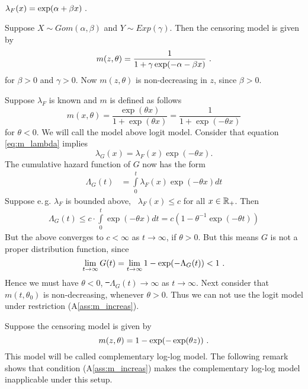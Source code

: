 $\lambda_F(x) = \exp(\alpha + \beta x)\textrm{ .}$
\begin{example}
	Suppose $X\sim Gom(\alpha, \beta)$ and $Y\sim Exp(\gamma)$. Then the censoring model is given by
	$$m(z, \theta) =\frac{1}{1 + \gamma\exp(-\alpha - \beta x)}\textrm{ .}$$
	for $\beta > 0$ and $\gamma > 0$. Now $m(z,\theta)$ is non-decreasing in $z$, since $\beta>0$.  
\end{example}
%
\begin{example}
	Suppose $\lambda_F$ is known and $m$ is defined as follows
	$$m(x,\theta) = \frac{\exp(\theta x)}{1+\exp(\theta x)} = \frac{1}{1+\exp(-\theta x)}$$
	for $\theta < 0$. We will call the model above logit model. Consider that equation \eqref{eq:m_lambda} implies  
	$$\lambda_G(x) = \lambda_F(x)\exp(-\theta x)\textrm{.}$$
	The cumulative hazard function of $G$ now has the form
	\begin{align*}
		\Lambda_G(t) &= \int\limits_0^t \lambda_F(x)\exp(-\theta x)dt
	\end{align*}
	Suppose e.\,g. $\lambda_F$ is bounded above, \ie\  $\lambda_F(x) \leq c$ for all $x\in \mathbb{R}_+$. Then
	\begin{align*}
		\Lambda_G(t) \leq c\cdot \int\limits_0^t \exp(-\theta x)dt  = c\left(1 -\theta^{-1} \exp(-\theta t)\right)
	\end{align*}	
	But the above converges to $c<\infty$ as $t\to\infty$, if $\theta>0$. But this means $G$ is not a proper distribution function, since
	$$\lim\limits_{t\to\infty} G(t) = \lim\limits_{t\to\infty} 1-\exp(-\Lambda_G(t)) < 1\textrm{ .}$$
	Hence we must have $\theta < 0$, \st\ $\Lambda_G(t) \to \infty$ as $t\to\infty$. Next consider that $m(t,\theta_0)$ is non-decreasing, whenever $\theta > 0$. Thus we can not use the logit model under restriction (A\ref{ass:m_increas}). 
\end{example}
%
\begin{example}
	Suppose the censoring model is given by
	$$m(z, \theta) = 1 - \exp(-\exp(\theta z))\textrm{ .}$$
	This model will be called complementary log-log model. The following remark shows that condition (A\ref{ass:m_increas}) makes the complementary log-log model inapplicable under this setup. 
\end{example}
